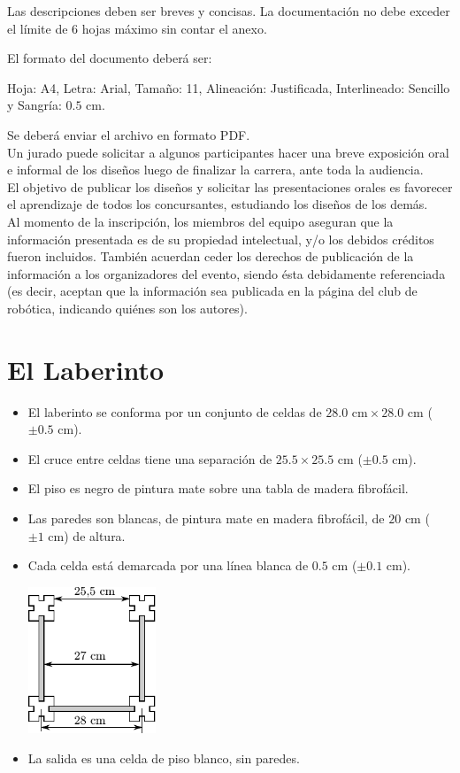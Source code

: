 \documentclass[a4paper,11pt]{article}
\newcommand{\cm}{\ensuremath{\mbox{~cm}}}
\begin{document}
Las descripciones deben ser breves y concisas. La documentación no debe exceder el límite de 6 hojas máximo sin contar el anexo. 

El formato del documento deberá ser: 

Hoja: A4, Letra: Arial, Tamaño: 11, Alineación: Justificada, Interlineado: Sencillo y Sangría: $0.5\cm$. 

Se deberá enviar el archivo en formato PDF.\\

Un jurado puede solicitar a algunos participantes hacer una breve exposición oral e informal de los diseños luego de finalizar la carrera, ante toda la audiencia.\\

El objetivo de publicar los diseños y solicitar las presentaciones orales es favorecer el aprendizaje de todos los concursantes, estudiando los diseños de los demás.\\

Al momento de la inscripción, los miembros del equipo aseguran que la información presentada es de su propiedad intelectual, y/o los debidos créditos fueron incluidos. También acuerdan ceder los derechos de publicación de la información a los organizadores del evento, siendo ésta debidamente referenciada (es decir, aceptan que la información sea publicada en la página del club de robótica, indicando quiénes son los autores).

\section*{El Laberinto}
\begin{itemize}
  \item El laberinto se conforma por un conjunto de celdas de $28.0\cm \times 28.0\cm$  ($\pm0.5\cm$).
  \item El cruce entre celdas tiene una separación de $25.5 \times 25.5\cm$ ($\pm0.5\cm$).
  \item El piso es negro de pintura mate sobre una tabla de madera fibrofácil.
  \item Las paredes son blancas, de pintura mate en madera fibrofácil, de $20\cm$ ($\pm1\cm$) de altura.
  \item Cada celda está demarcada por una línea blanca de $0.5\cm$ ($\pm0.1\cm$).
    \begin{center}
      \includegraphics[width=0.3\textwidth]{paredes}
    \end{center}
  \item La salida es una celda de piso blanco, sin paredes.
\end{itemize}
\end{document}
